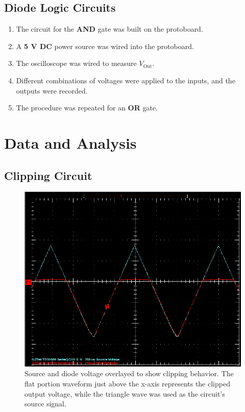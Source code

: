 \documentclass[twocolumn,english]{IEEEtran}
\begin{document}
\subsection{Diode Logic Circuits}
  \begin{enumerate}
   \item The circuit for the \textbf{AND} gate was built on the protoboard.
   \item A \textbf{5 V DC} power source was wired into the protoboard.
   \item The oscilloscope was wired to measure $V_{\text{Out}}$.
   \item Different combinations of voltages were applied to the inputs, and the outputs were recorded.
   \item The procedure was repeated for an \textbf{OR} gate.
  \end{enumerate}

\noindent\hrulefill


\section{Data and Analysis}

\subsection{\textbf{Clipping Circuit}}

\begin{figure}[h]
  \begin{centering}
  \begin{center}
  \includegraphics[width=\linewidth]{./Images/Circuit_1.png}
  \caption{Source and diode voltage overlayed to show clipping behavior. The flat portion waveform just above the x-axis represents the clipped output voltage, while the triangle wave was used as the circuit's source signal.}
  \label{fig:circuit_1_results}
  \end{center}
  \par\end{centering}
\end{figure}
\end{document}
